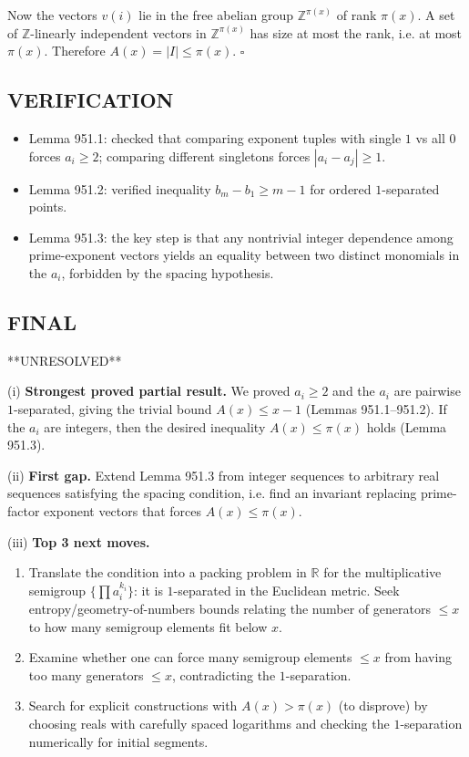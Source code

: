 Now the vectors $v(i)$ lie in the free abelian group $\mathbb Z^{\pi(x)}$ of rank $\pi(x)$.
A set of $\mathbb Z$-linearly independent vectors in $\mathbb Z^{\pi(x)}$ has size at most the rank, i.e. at most $\pi(x)$.
Therefore $A(x)=|I|\le \pi(x)$.
\hfill $\square$

\subsection*{VERIFICATION}
\begin{itemize}
\item Lemma 951.1: checked that comparing exponent tuples with single $1$ vs all $0$ forces $a_i\ge2$; comparing different singletons forces $|a_i-a_j|\ge1$.
\item Lemma 951.2: verified inequality $b_m-b_1\ge m-1$ for ordered $1$-separated points.
\item Lemma 951.3: the key step is that any nontrivial integer dependence among prime-exponent vectors yields an equality between two distinct monomials in the $a_i$, forbidden by the spacing hypothesis.
\end{itemize}

\subsection*{FINAL}
**UNRESOLVED**

(i) \textbf{Strongest proved partial result.}
We proved $a_i\ge2$ and the $a_i$ are pairwise $1$-separated, giving the trivial bound $A(x)\le x-1$ (Lemmas 951.1--951.2). If the $a_i$ are integers, then the desired inequality $A(x)\le\pi(x)$ holds (Lemma 951.3).

(ii) \textbf{First gap.}
Extend Lemma 951.3 from integer sequences to arbitrary real sequences satisfying the spacing condition, i.e. find an invariant replacing prime-factor exponent vectors that forces $A(x)\le\pi(x)$.

(iii) \textbf{Top 3 next moves.}
\begin{enumerate}
\item Translate the condition into a packing problem in $\mathbb R$ for the multiplicative semigroup $\{\prod a_i^{k_i}\}$: it is $1$-separated in the Euclidean metric. Seek entropy/geometry-of-numbers bounds relating the number of generators $\le x$ to how many semigroup elements fit below $x$.
\item Examine whether one can force many semigroup elements $\le x$ from having too many generators $\le x$, contradicting the $1$-separation.
\item Search for explicit constructions with $A(x) > \pi(x)$ (to disprove) by choosing reals with carefully spaced logarithms and checking the $1$-separation numerically for initial segments.
\end{enumerate}

